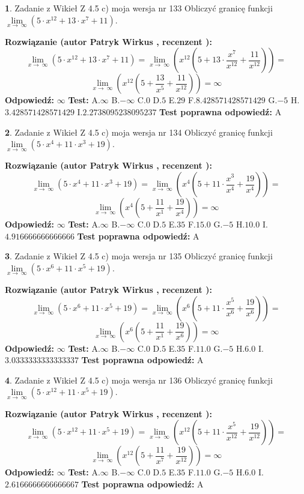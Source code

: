 \documentclass[12pt, a4paper]{article}
\theoremstyle{definition} %
\newtheorem{zad}{}
\newcommand{\zadStart}[1]{\begin{zad}#1\newline}
\newcommand{\zadStop}{\end{zad}}
\newcommand{\rozwStart}[2]{\noindent \textbf{Rozwiązanie (autor #1 , recenzent #2): }\newline}
\newcommand{\rozwStop}{\newline}
\newcommand{\odpStart}{\noindent \textbf{Odpowiedź:}\newline}
\newcommand{\odpStop}{\newline}
\newcommand{\testStart}{\noindent \textbf{Test:}\newline}
\newcommand{\testStop}{\newline}
\newcommand{\kluczStart}{\noindent \textbf{Test poprawna odpowiedź:}\newline}
\newcommand{\kluczStop}{\newline}
\begin{document}
\zadStart{Zadanie z Wikieł Z 4.5 c) moja wersja nr 133}
Obliczyć granicę funkcji  $\lim\limits_{x\to\ \infty}(5 \cdot x^{12}+13 \cdot x^{7}+11)$.
\zadStop
\rozwStart{Patryk Wirkus}{}
$$\lim\limits_{x\to\ \infty}(5 \cdot x^{12}+13 \cdot x^{7}+11) = \lim\limits_{x\to\ \infty}(x^{12}(5 +13 \cdot \frac{x^{7}}{x^{12}}+\frac{11}{x^{12}})) =$$ $$\lim\limits_{x\to\ \infty}(x^{12}(5 +\frac{13}{x^{5}}+\frac{11}{x^{12}})) =\infty$$
\rozwStop
\odpStart
$\infty$
\odpStop
\testStart
A.$\infty$ B.$-\infty$ C.$0$ D.$5$ E.$29$
F.$8.428571428571429$ G.$-5$
H.$3.428571428571429$
I.$2.2738095238095237$
\testStop
\kluczStart
A
\kluczStop



\zadStart{Zadanie z Wikieł Z 4.5 c) moja wersja nr 134}
Obliczyć granicę funkcji  $\lim\limits_{x\to\ \infty}(5 \cdot x^{4}+11 \cdot x^{3}+19)$.
\zadStop
\rozwStart{Patryk Wirkus}{}
$$\lim\limits_{x\to\ \infty}(5 \cdot x^{4}+11 \cdot x^{3}+19) = \lim\limits_{x\to\ \infty}(x^{4}(5 +11 \cdot \frac{x^{3}}{x^{4}}+\frac{19}{x^{4}})) =$$ $$\lim\limits_{x\to\ \infty}(x^{4}(5 +\frac{11}{x^{1}}+\frac{19}{x^{4}})) =\infty$$
\rozwStop
\odpStart
$\infty$
\odpStop
\testStart
A.$\infty$ B.$-\infty$ C.$0$ D.$5$ E.$35$
F.$15.0$ G.$-5$
H.$10.0$
I.$4.916666666666666$
\testStop
\kluczStart
A
\kluczStop



\zadStart{Zadanie z Wikieł Z 4.5 c) moja wersja nr 135}
Obliczyć granicę funkcji  $\lim\limits_{x\to\ \infty}(5 \cdot x^{6}+11 \cdot x^{5}+19)$.
\zadStop
\rozwStart{Patryk Wirkus}{}
$$\lim\limits_{x\to\ \infty}(5 \cdot x^{6}+11 \cdot x^{5}+19) = \lim\limits_{x\to\ \infty}(x^{6}(5 +11 \cdot \frac{x^{5}}{x^{6}}+\frac{19}{x^{6}})) =$$ $$\lim\limits_{x\to\ \infty}(x^{6}(5 +\frac{11}{x^{1}}+\frac{19}{x^{6}})) =\infty$$
\rozwStop
\odpStart
$\infty$
\odpStop
\testStart
A.$\infty$ B.$-\infty$ C.$0$ D.$5$ E.$35$
F.$11.0$ G.$-5$
H.$6.0$
I.$3.0333333333333337$
\testStop
\kluczStart
A
\kluczStop



\zadStart{Zadanie z Wikieł Z 4.5 c) moja wersja nr 136}
Obliczyć granicę funkcji  $\lim\limits_{x\to\ \infty}(5 \cdot x^{12}+11 \cdot x^{5}+19)$.
\zadStop
\rozwStart{Patryk Wirkus}{}
$$\lim\limits_{x\to\ \infty}(5 \cdot x^{12}+11 \cdot x^{5}+19) = \lim\limits_{x\to\ \infty}(x^{12}(5 +11 \cdot \frac{x^{5}}{x^{12}}+\frac{19}{x^{12}})) =$$ $$\lim\limits_{x\to\ \infty}(x^{12}(5 +\frac{11}{x^{7}}+\frac{19}{x^{12}})) =\infty$$
\rozwStop
\odpStart
$\infty$
\odpStop
\testStart
A.$\infty$ B.$-\infty$ C.$0$ D.$5$ E.$35$
F.$11.0$ G.$-5$
H.$6.0$
I.$2.6166666666666667$
\testStop
\kluczStart
A
\kluczStop
\end{document}

